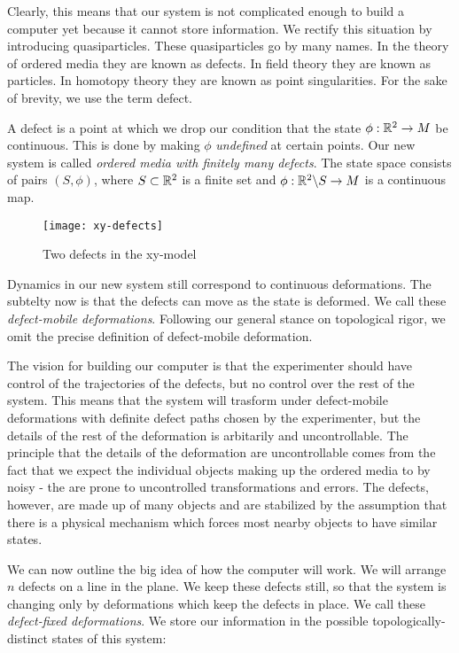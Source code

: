 Clearly, this means that our system is not complicated enough to build a computer yet because it cannot store information. We rectify this situation by introducing quasiparticles. These quasiparticles go by many names. In the theory of ordered media they are known as defects. In field theory they are known as particles. In homotopy theory they are known as point singularities. For the sake of brevity, we use the term defect.

A defect is a point at which we drop our condition that the state $\phi:\mathbb{R}^2\to M$ be continuous. This is done by making $\phi$ \textit{undefined} at certain points. Our new system is called \textit{ordered media with finitely many defects}. The state space consists of pairs $(S,\phi)$, where $S\subset \mathbb{R}^2$ is a finite set and $\phi: \mathbb{R}^2\backslash S\to M$ is a continuous map.

\begin{figure}
\begin{center}
\texttt{[image: xy-defects]}
\caption{Two defects in the xy-model}
\label{fig:xy-defects}
\end{center}
\end{figure}

Dynamics in our new system still correspond to continuous deformations. The subtelty now is that the defects can move as the state is deformed. We call these \textit{defect-mobile deformations}. Following our general stance on topological rigor, we omit the precise definition of defect-mobile deformation. 

The vision for building our computer is that the experimenter should have control of the trajectories of the defects, but no control over the rest of the system. This means that the system will trasform under defect-mobile deformations with definite defect paths chosen by the experimenter, but the details of the rest of the deformation is arbitarily and uncontrollable. The principle that the details of the deformation are uncontrollable comes from the fact that we expect the individual objects making up the ordered media to by noisy - the are prone to uncontrolled transformations and errors. The defects, however, are made up of many objects and are stabilized by the assumption that there is a physical mechanism which forces most nearby objects to have similar states.

We can now outline the big idea of how the computer will work. We will arrange $n$ defects on a line in the plane. We keep these defects still, so that the system is changing only by deformations which keep the defects in place. We call these \textit{defect-fixed deformations}. We store our information in the possible topologically-distinct states of this system:

